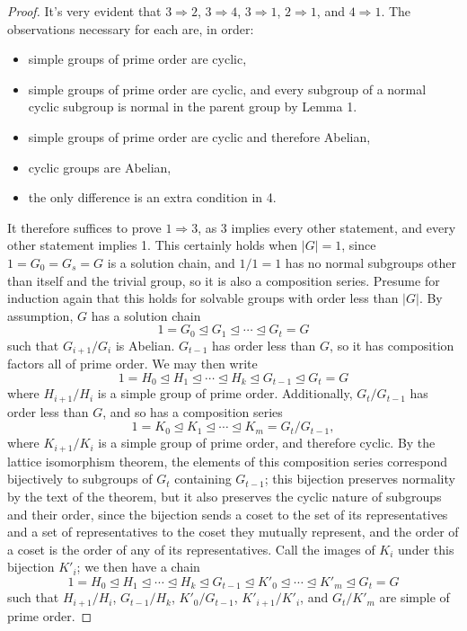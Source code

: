 \documentclass{article}
\newcommand{\nsub}{\trianglelefteq}
\begin{document}
\begin{proof}
  It's very evident that $3 \Rightarrow 2$, $3 \Rightarrow 4$, $3 \Rightarrow 1$, $2 \Rightarrow 1$, and $4 \Rightarrow 1$.
  The observations necessary for each are, in order:
  \begin{itemize}
  \item simple groups of prime order are cyclic,
  \item simple groups of prime order are cyclic, and every subgroup of a normal cyclic subgroup is normal in the parent group by Lemma 1.
  \item simple groups of prime order are cyclic and therefore Abelian,
  \item cyclic groups are Abelian,
  \item the only difference is an extra condition in 4.
  \end{itemize}

  It therefore suffices to prove $1 \Rightarrow 3$, as 3 implies every other statement, and every other statement implies 1.
  This certainly holds when $|G| = 1$, since $1 = G_{0} = G_{s} = G$ is a solution chain,
  and $1 / 1 = 1$ has no normal subgroups other than itself and the trivial group, so it is also a composition series.
  Presume for induction again that this holds for solvable groups with order less than $|G|$.
  By assumption, $G$ has a solution chain
  \[
    1 = G_{0} \nsub G_{1} \nsub \cdots \nsub G_{t}  = G
  \]
  such that $G_{i+1} / G_{i}$ is Abelian.
  $G_{t-1}$ has order less than $G$, so it has composition factors all of prime order.
  We may then write
  \[
    1 = H_{0} \nsub H_{1} \nsub \cdots \nsub H_{k} \nsub G_{t-1} \nsub G_{t} = G
  \]
  where $H_{i+1} / H_{i}$ is a simple group of prime order.
  Additionally, $G_{t} / G_{t-1}$ has order less than $G$, and so has a composition series
  \[
    1 = K_{0} \nsub K_{1} \nsub \cdots \nsub K_{m} = G_{t} / G_{t-1},
  \]
  where $K_{i+1} / K_{i}$ is a simple group of prime order, and therefore cyclic.
  By the lattice isomorphism theorem, the elements of this composition series correspond bijectively to subgroups of $G_{t}$ containing $G_{t-1}$;
  this bijection preserves normality by the text of the theorem, but it also preserves the cyclic nature of subgroups and their order,
  since the bijection sends a coset to the set of its representatives and a set of representatives to the coset they mutually represent,
  and the order of a coset is the order of any of its representatives.
  Call the images of $K_{i}$ under this bijection $K'_{i}$; we then have a chain
  \[
    1 = H_{0} \nsub H_{1} \nsub \cdots \nsub H_{k} \nsub G_{t-1} \nsub K'_{0} \nsub \cdots \nsub K'_{m} \nsub G_{t} = G
  \]
  such that $H_{i+1} / H_{i}$, $G_{t-1} / H_{k}$, $K'_{0} / G_{t-1}$, $K'_{i+1} / K'_{i}$, and $G_{t} / K'_{m}$ are simple of prime order.

\end{proof}
\end{document}

